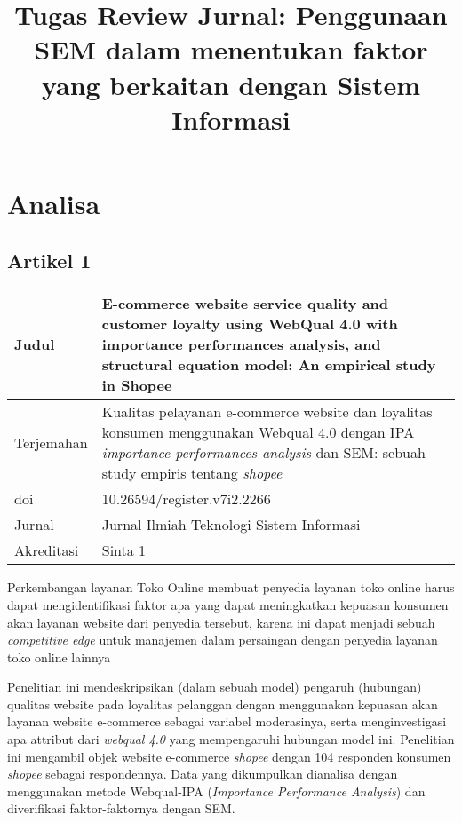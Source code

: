 \documentclass{article}
\title{Tugas Review Jurnal: Penggunaan SEM dalam menentukan faktor yang berkaitan dengan Sistem Informasi}
\begin{document}
\section{Analisa}
\subsection{Artikel 1}
\begin{tabular}{|p{2cm}|p{12cm}|}
    \hline
    Judul & E-commerce website service quality and customer loyalty
    using WebQual 4.0 with importance performances analysis,
    and structural equation model: An empirical study in Shopee\cite{ECommerceWebsWijaya2021}\\
    \hline
    Terjemahan & 
    Kualitas pelayanan e-commerce website dan loyalitas konsumen
    menggunakan Webqual 4.0 dengan IPA \emph{importance performances analysis} dan SEM: sebuah study empiris tentang \emph{shopee}\\
    \hline
    doi & 10.26594/register.v7i2.2266\\    
    \hline
    Jurnal & Jurnal Ilmiah Teknologi Sistem Informasi\\
    \hline
    Akreditasi & Sinta 1\\
    \hline
\end{tabular}

Perkembangan layanan Toko Online 
membuat penyedia layanan 
toko online harus dapat mengidentifikasi 
faktor apa yang dapat meningkatkan 
kepuasan konsumen akan layanan website dari  penyedia tersebut, 
karena ini dapat menjadi sebuah \emph{competitive edge} 
untuk manajemen dalam persaingan dengan penyedia layanan toko online lainnya

Penelitian ini  mendeskripsikan (dalam sebuah model) 
pengaruh (hubungan) qualitas website  
pada loyalitas pelanggan dengan 
menggunakan kepuasan akan layanan website e-commerce  sebagai variabel moderasinya, serta  menginvestigasi apa attribut dari \emph{webqual 4.0} 
yang mempengaruhi hubungan model ini. 
Penelitian ini mengambil objek 
website e-commerce \emph{shopee} 
dengan 104 responden konsumen \emph{shopee} 
sebagai respondennya.
Data yang dikumpulkan dianalisa 
dengan menggunakan metode 
Webqual-IPA (\emph{Importance Performance Analysis}) 
dan diverifikasi faktor-faktornya dengan SEM.
\end{document}
